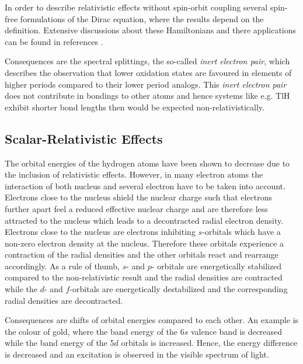 In order to describe relativistic effects without spin-orbit coupling
several spin-free formulations of the Dirac equation, where the results
depend on the definition. \cite{Visscher99}
Extensive discussions about these Hamiltonians and there applications
can be found in references \cite{ReiherWolf09,Saue11}.

Consequences are the spectral splittings, the so-called \emph{inert electron
pair}, which describes the observation that lower oxidation states
are favoured in elements of higher periods compared to their lower period
analogs. This \emph{inert electron pair} does not contribute in bondings
to other atoms and hence systems like e.g. TlH exhibit shorter bond lengths
then would be expected non-relativistically.


\subsection{Scalar-Relativistic Effects}
The orbital energies of the hydrogen atoms have been shown to decrease
due to the inclusion of relativistic effects. However, in many electron
atoms the interaction of both nucleus and several electron have to be taken
into account. Electrons close to the nucleus shield the nuclear charge such
that electrons further apart feel a reduced effective nuclear charge and
are therefore less attracted to the nucleus which leads to a decontracted
radial electron density.
Electrons close to the nucleus are electrons inhibiting $s$-orbitals which
have a non-zero electron density at the nucleus. Therefore these orbitals
experience a contraction of the radial densities and the other orbitals
react and rearrange accordingly. As a rule of thumb, $s$- and $p$- orbitals
are energetically stabilized compared to the non-relativistic result
and the radial densities are contracted while
the $d$- and $f$-orbitals are energetically destabilized
and the corresponding radial densities are decontracted.

Consequences are shifts of orbital energies compared to each other. An example
is the colour of gold, where the band energy of the 6$s$ valence band is
decreased while the band energy of the 5$d$ orbitals is increased. Hence,
the energy difference is decreased and an excitation is observed in the
visible spectrum of light.

